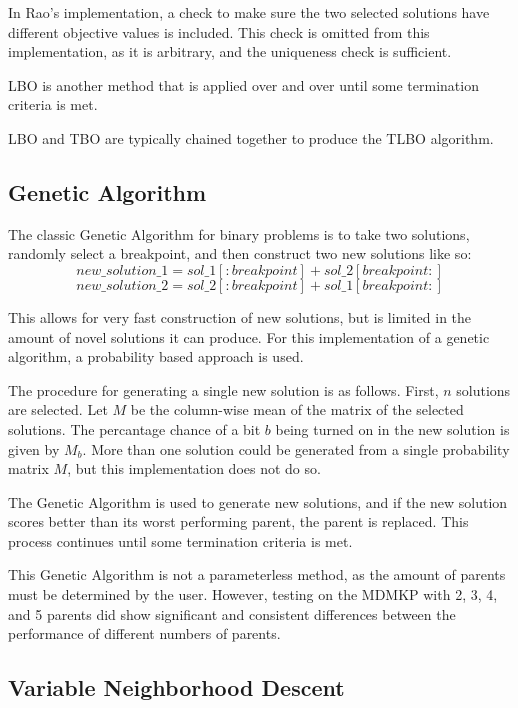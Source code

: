 \documentclass[11pt, letterpaper, onecolumn]{article}
\begin{document}
In Rao's implementation, a check to make sure the two selected solutions have different objective values is included. This check is omitted from this implementation, as it is arbitrary, and the uniqueness check is sufficient. 

LBO is another method that is applied over and over until some termination criteria is met. 

LBO and TBO are typically chained together to produce the TLBO algorithm. 

\clearpage 
\subsection{Genetic Algorithm}

The classic Genetic Algorithm for binary problems is to take two solutions, randomly select a breakpoint, and then construct two new solutions like so:
\begin{equation}
new\_solution\_1 = sol\_1[:breakpoint] + sol\_2[breakpoint:]
\end{equation}
$$ new\_solution\_2 = sol\_2[:breakpoint] + sol\_1[breakpoint:] $$

This allows for very fast construction of new solutions, but is limited in the amount of novel solutions it can produce. For this implementation of a genetic algorithm, a probability based approach is used. 

The procedure for generating a single new solution is as follows. First, $n$ solutions are selected. Let $M$ be the column-wise mean of the matrix of the selected solutions. The percantage chance of a bit $b$ being turned on in the new solution is given by $M_b$. More than one solution could be generated from a single probability matrix $M$, but this implementation does not do so. 

The Genetic Algorithm is used to generate new solutions, and if the new solution scores better than its worst performing parent, the parent is replaced. This process continues until some termination criteria is met. 

This Genetic Algorithm is not a parameterless method, as the amount of parents must be determined by the user. However, testing on the MDMKP with 2, 3, 4, and 5 parents did show significant and consistent differences between the performance of different numbers of parents. 

\subsection{Variable Neighborhood Descent}
\end{document}
